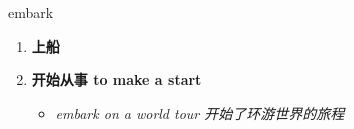 
\begin{frame}
{\huge embark}
\begin{center}
\begin{enumerate}\Large
  \item \textbf{上船}
  \item \textbf{开始从事 to make a start}
  \begin{itemize}
    \item \em{\Large{embark on a world tour 开始了环游世界的旅程}}
  \end{itemize}
\end{enumerate}
\end{center}
\end{frame}
